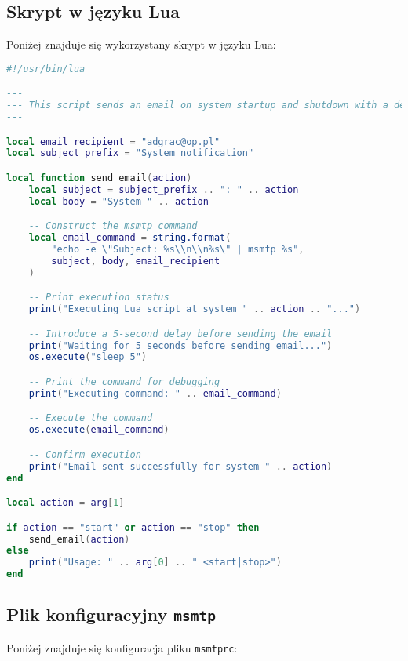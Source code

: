 \documentclass{article}
\begin{document}
\subsection{Skrypt w języku Lua}

Poniżej znajduje się wykorzystany skrypt w języku Lua:

\begin{lstlisting}[language=Lua, caption=Skrypt Lua., label=lst:lua]
#!/usr/bin/lua

---
--- This script sends an email on system startup and shutdown with a delay.
---

local email_recipient = "adgrac@op.pl"
local subject_prefix = "System notification"

local function send_email(action)
    local subject = subject_prefix .. ": " .. action
    local body = "System " .. action

    -- Construct the msmtp command
    local email_command = string.format(
        "echo -e \"Subject: %s\\n\\n%s\" | msmtp %s",
        subject, body, email_recipient
    )

    -- Print execution status
    print("Executing Lua script at system " .. action .. "...")

    -- Introduce a 5-second delay before sending the email
    print("Waiting for 5 seconds before sending email...")
    os.execute("sleep 5")

    -- Print the command for debugging
    print("Executing command: " .. email_command)

    -- Execute the command
    os.execute(email_command)

    -- Confirm execution
    print("Email sent successfully for system " .. action)
end

local action = arg[1]

if action == "start" or action == "stop" then
    send_email(action)
else
    print("Usage: " .. arg[0] .. " <start|stop>")
end


\end{lstlisting}

\newpage

\subsection{Plik konfiguracyjny \texttt{msmtp}}

Poniżej znajduje się konfiguracja pliku \texttt{msmtprc}:
\end{document}
